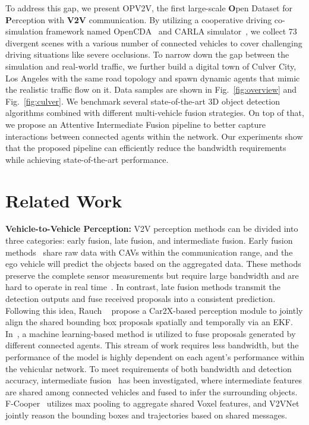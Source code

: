 To address this gap, we present OPV2V, the first large-scale \textbf{O}pen Dataset for \textbf{P}erception with \textbf{V2V} communication. By utilizing a cooperative driving co-simulation framework named OpenCDA~\cite{xu2021opencda} and CARLA simulator~\cite{Dosovitskiy17}, we collect 73 divergent scenes with a various number of connected vehicles to cover challenging driving situations like severe occlusions. To narrow down the gap between the simulation and real-world traffic, we further build a digital town of Culver City, Los Angeles with the same road topology and spawn dynamic agents that mimic the realistic traffic flow on it.  Data samples are shown in Fig.~\ref{fig:overview} and Fig.~\ref{fig:culver}. We benchmark several state-of-the-art 3D object detection algorithms combined with different multi-vehicle fusion strategies. On top of that, we propose an Attentive Intermediate Fusion pipeline to better capture interactions between connected agents within the network. Our experiments show that the proposed pipeline can efficiently reduce the bandwidth requirements while achieving state-of-the-art performance.

\section{Related Work}
\noindent\textbf{Vehicle-to-Vehicle Perception: }V2V perception methods can be divided into three categories: early fusion, late fusion, and intermediate fusion. Early fusion methods~\cite{cooper} share raw data with CAVs within the communication range, and the ego vehicle will predict the objects based on the aggregated data. These methods preserve the complete sensor measurements but require large bandwidth and are hard to operate in real time~\cite{Wang2020V2VNetVC}. In contrast, late fusion methods transmit the detection outputs and fuse received proposals into a consistent prediction. Following this idea, Rauch \etal~\cite{Rauch2012} propose a Car2X-based perception module to jointly align the shared bounding box proposals spatially and temporally via an EKF. In~\cite{Rawashdeh2018}, a machine learning-based method is utilized to fuse proposals generated by different connected agents. This stream of work requires less bandwidth, but the performance of the model is highly dependent on each agent's performance within the vehicular network. To meet requirements of both bandwidth and detection accuracy, intermediate fusion~\cite{f-cooper, Wang2020V2VNetVC} has been investigated, where intermediate features are shared among connected vehicles and fused to infer the surrounding objects. F-Cooper~\cite{f-cooper} utilizes max pooling to aggregate shared Voxel features, and V2VNet~\cite{Wang2020V2VNetVC} jointly reason the bounding boxes and trajectories based on shared messages. 

